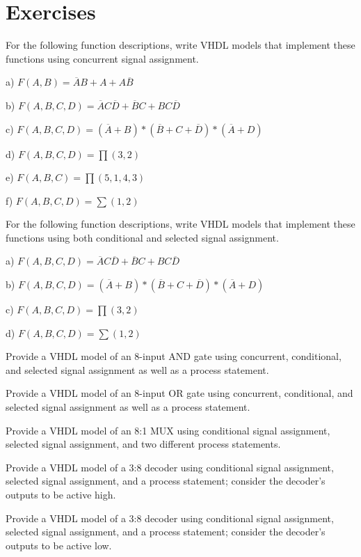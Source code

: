 \section{Exercises}
\begin{my_num_list}
\item For the following function descriptions, write VHDL models that implement these functions using concurrent signal assignment.

a) $F(A,B) =\overline{A}B +A +A\overline{B}$

b) $F(A,B,C,D) =\overline{A}C\overline{D} +\overline{B}C +BC\overline{D}$

c) $F(A,B,C,D) =(\overline{A}+B)*(\overline{B}+C+\overline{D})*(\overline{A}+D)$

d) $F(A,B,C,D) = \displaystyle\prod(3,2) $

e) $F(A,B,C) = \displaystyle\prod(5,1,4,3) $

f) $F(A,B,C,D) = \displaystyle\sum(1,2) $

\item For the following function descriptions, write VHDL models that implement these functions using both conditional and selected signal assignment.

a) $F(A,B,C,D) =\overline{A}C\overline{D} +\overline{B}C +BC\overline{D}$

b) $F(A,B,C,D) =(\overline{A}+B)*(\overline{B}+C+\overline{D})*(\overline{A}+D)$

c) $F(A,B,C,D) = \displaystyle\prod(3,2) $

d) $F(A,B,C,D) = \displaystyle\sum(1,2) $

\item Provide a VHDL model of an 8-input AND gate using concurrent, conditional, and selected signal assignment as well as a process statement.
\item Provide a VHDL model of an 8-input OR gate using concurrent, conditional, and selected signal assignment as well as a process statement.
\item Provide a VHDL model of an 8:1 MUX using conditional signal assignment, selected signal assignment, and two different process statements.
\item Provide a VHDL model of a 3:8 decoder using conditional signal assignment, selected signal assignment, and a process statement; consider the decoder’s outputs to be active high.
\item Provide a VHDL model of a 3:8 decoder using conditional signal assignment, selected signal assignment, and a process statement; consider the decoder’s outputs to be active low.
\end{my_num_list}


